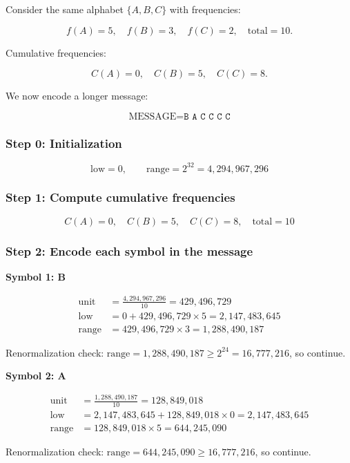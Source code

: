 \documentclass[12pt]{article}
\begin{document}
Consider the same alphabet $\{A,B,C\}$ with frequencies:

\[
f(A) = 5,\quad f(B) = 3,\quad f(C) = 2,\quad \text{total} = 10.
\]

Cumulative frequencies:

\[
C(A) = 0,\quad C(B) = 5,\quad C(C) = 8.
\]

We now encode a longer message:

\[
\text{MESSAGE} = \texttt{B A C C C C}
\]

\subsubsection*{Step 0: Initialization}
\[
\text{low} = 0,\qquad \text{range} = 2^{32} = 4{,}294{,}967{,}296
\]

\subsubsection*{Step 1: Compute cumulative frequencies}
\[
C(A)=0,\quad C(B)=5,\quad C(C)=8,\quad \text{total}=10
\]

\subsubsection*{Step 2: Encode each symbol in the message}

\textbf{Symbol 1: B}

\begin{align*}
\text{unit} &= \frac{4{,}294{,}967{,}296}{10} = 429{,}496{,}729 \\
\text{low} &= 0 + 429{,}496{,}729 \times 5 = 2{,}147{,}483{,}645 \\
\text{range} &= 429{,}496{,}729 \times 3 = 1{,}288{,}490{,}187
\end{align*}

Renormalization check: $\text{range} = 1{,}288{,}490{,}187 \ge 2^{24} = 16{,}777{,}216$, so continue.

\vspace{2mm}
\textbf{Symbol 2: A}

\begin{align*}
\text{unit} &= \frac{1{,}288{,}490{,}187}{10} = 128{,}849{,}018 \\
\text{low} &= 2{,}147{,}483{,}645 + 128{,}849{,}018 \times 0 = 2{,}147{,}483{,}645 \\
\text{range} &= 128{,}849{,}018 \times 5 = 644{,}245{,}090
\end{align*}

Renormalization check: $\text{range} = 644{,}245{,}090 \ge 16{,}777{,}216$, so continue.
\end{document}

